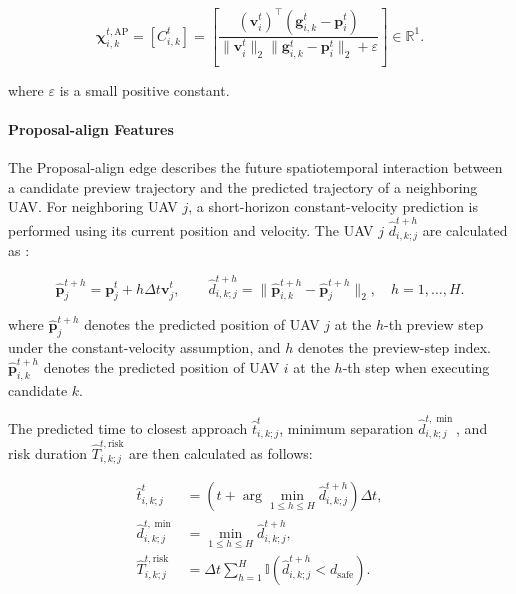 \begin{equation}
\label{eq:agent_proposal_edge}
\boldsymbol\chi_{i,k}^{t,\mathrm{AP}}
=
\left[C_{i,k}^{t}\right]
=
\left[
\frac{(\mathbf v_i^t)^\top(\mathbf g_{i,k}^t-\mathbf p_i^t)}
{\|\mathbf v_i^t\|_2
 \|\mathbf g_{i,k}^t-\mathbf p_i^t\|_2+\varepsilon}
\right]
\in\mathbb R^1.
\end{equation}

\noindent
where $\varepsilon$ is a small positive constant.

\paragraph{Proposal-align Features}
The Proposal-align edge describes the future spatiotemporal interaction between a candidate preview trajectory and the predicted trajectory of a neighboring UAV. For neighboring UAV $j$, a short-horizon constant-velocity prediction is performed using its current position and velocity. The UAV $j$ $\hat d_{i,k;j}^{t+h}$ are calculated as :

\begin{equation}
\label{eq:pairwise_short_horizon_prediction}
\hat{\mathbf p}_j^{t+h}=\mathbf p_j^t+h\Delta t\mathbf v_j^t,
\qquad
\hat d_{i,k;j}^{t+h}
=\|\hat{\mathbf p}_{i,k}^{t+h}-\hat{\mathbf p}_j^{t+h}\|_2,
\quad h=1,\ldots,H.
\end{equation}

\noindent
where $\hat{\mathbf{p}}_j^{t+h}$ denotes the predicted position of UAV $j$ at the $h$-th preview step under the constant-velocity assumption, and $h$ denotes the preview-step index. $\hat{\mathbf{p}}_{i,k}^{t+h}$ denotes the predicted position of UAV $i$ at the $h$-th step when executing candidate $k$.

The predicted time to closest approach $ \hat t_{i,k;j}^{t}$, minimum separation $\hat d_{i,k;j}^{t,\min}$, and risk duration $\hat T_{i,k;j}^{t,\mathrm{risk}}$ are then calculated as follows:

\begin{equation}
    \label{eq:proposal_align_statistics}
    \begin{aligned}
        \hat t_{i,k;j}^{t}
        &=
        \left(
        t + \arg\min_{1\leq h\leq H}
        \hat d_{i,k;j}^{t+h}
        \right)\Delta t, \\
        \hat d_{i,k;j}^{t,\min}
        &=
        \min_{1\leq h\leq H}
        \hat d_{i,k;j}^{t+h}, \\
        \hat T_{i,k;j}^{t,\mathrm{risk}}
        &=
        \Delta t
        \sum_{h=1}^{H}
        \mathbb{I}
        \left(
        \hat d_{i,k;j}^{t+h}<d_{\mathrm{safe}}
        \right).
    \end{aligned}
\end{equation}

